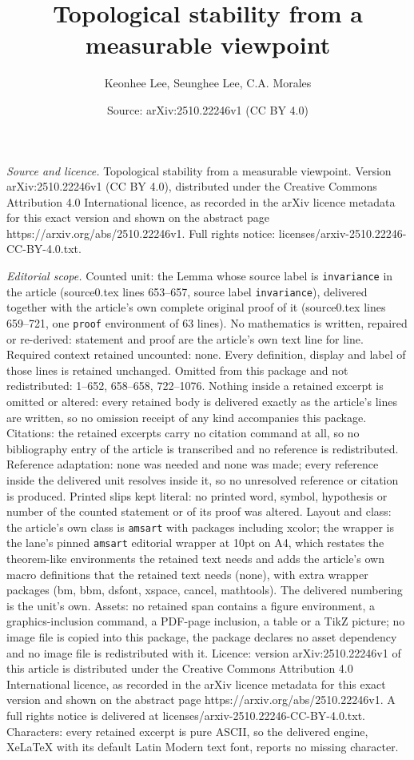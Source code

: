 \documentclass[10pt,a4paper]{amsart}
\title[Topological stability from a measurable viewpoint]{Topological stability from a measurable viewpoint}
\author{Keonhee Lee, Seunghee Lee, C.A. Morales}
\date{Source: arXiv:2510.22246v1 (CC BY 4.0)}
\begin{document}
\maketitle

\noindent\emph{Source and licence.} Topological stability from a measurable viewpoint. Version arXiv:2510.22246v1 (CC BY 4.0), distributed under the Creative Commons Attribution 4.0 International licence, as recorded in the arXiv licence metadata for this exact version and shown on the abstract page https://arxiv.org/abs/2510.22246v1. Full rights notice: licenses/arxiv-2510.22246-CC-BY-4.0.txt.\par\smallskip

\noindent\textit{Editorial scope.} Counted unit: the Lemma whose source label is \texttt{invariance} in the article (source0.tex lines 653--657, source label \texttt{invariance}), delivered together with the article's own complete original proof of it (source0.tex lines 659--721, one \texttt{proof} environment of 63 lines). No mathematics is written, repaired or re-derived: statement and proof are the article's own text line for line. Required context retained uncounted: none. Every definition, display and label of those lines is retained unchanged. Omitted from this package and not redistributed: 1--652, 658--658, 722--1076. Nothing inside a retained excerpt is omitted or altered: every retained body is delivered exactly as the article's lines are written, so no omission receipt of any kind accompanies this package. Citations: the retained excerpts carry no citation command at all, so no bibliography entry of the article is transcribed and no reference is redistributed. Reference adaptation: none was needed and none was made; every reference inside the delivered unit resolves inside it, so no unresolved reference or citation is produced. Printed slips kept literal: no printed word, symbol, hypothesis or number of the counted statement or of its proof was altered. Layout and class: the article's own class is \texttt{amsart} with packages including xcolor; the wrapper is the lane's pinned \texttt{amsart} editorial wrapper at 10pt on A4, which restates the theorem-like environments the retained text needs and adds the article's own macro definitions that the retained text needs (none), with extra wrapper packages (bm, bbm, dsfont, xspace, cancel, mathtools). The delivered numbering is the unit's own. Assets: no retained span contains a figure environment, a graphics-inclusion command, a PDF-page inclusion, a table or a TikZ picture; no image file is copied into this package, the package declares no asset dependency and no image file is redistributed with it. Licence: version arXiv:2510.22246v1 of this article is distributed under the Creative Commons Attribution 4.0 International licence, as recorded in the arXiv licence metadata for this exact version and shown on the abstract page https://arxiv.org/abs/2510.22246v1. A full rights notice is delivered at licenses/arxiv-2510.22246-CC-BY-4.0.txt. Characters: every retained excerpt is pure ASCII, so the delivered engine, XeLaTeX with its default Latin Modern text font, reports no missing character.
\end{document}
